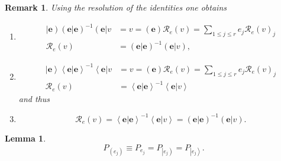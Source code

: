 \documentclass[aps,preprint]{revtex4}%
\newtheorem{lemma}[theorem]{Lemma}
\newtheorem{remark}[theorem]{Remark}
\begin{document}
\begin{remark}
Using the resolution of the identities one obtains

\begin{enumerate}
\item
\begin{align}
\left\vert \mathbf{e}\right)  \left(  \left.  \mathbf{e}\right\vert
\mathbf{e}\right)  ^{-1}\left(  \mathbf{e}\right\vert v  &  =v=\left(
\mathbf{e}\right)  \mathcal{R}_{e}\left(  v\right)  =\sum_{1\leq j\leq r}%
e_{j}\mathcal{R}_{e}\left(  v\right)  _{j}\\
\mathcal{R}_{e}\left(  v\right)   &  =\left(  \left.  \mathbf{e}\right\vert
\mathbf{e}\right)  ^{-1}\left(  \left.  \mathbf{e}\right\vert v\right)  ,
\end{align}


\item
\begin{align}
\left\vert \mathbf{e}\right\rangle \left\langle \left.  \mathbf{e}\right\vert
\mathbf{e}\right\rangle ^{-1}\left\langle \mathbf{e}\right\vert v  &
=v=\left(  \mathbf{e}\right)  \mathcal{R}_{e}\left(  v\right)  =\sum_{1\leq
j\leq r}e_{j}\mathcal{R}_{e}\left(  v\right)  _{j}\\
\mathcal{R}_{e}\left(  v\right)   &  =\left\langle \left.  \mathbf{e}%
\right\vert \mathbf{e}\right\rangle ^{-1}\left\langle \left.  \mathbf{e}%
\right\vert v\right\rangle
\end{align}
and thus

\item
\begin{equation}
\mathcal{R}_{e}\left(  v\right)  =\left\langle \left.  \mathbf{e}\right\vert
\mathbf{e}\right\rangle ^{-1}\left\langle \left.  \mathbf{e}\right\vert
v\right\rangle =\left(  \left.  \mathbf{e}\right\vert \mathbf{e}\right)
^{-1}\left(  \left.  \mathbf{e}\right\vert v\right)  .
\end{equation}

\end{enumerate}
\end{remark}

\begin{lemma}%
\begin{equation}
P_{\left(  e_{j}\right)  }\equiv P_{e_{j}}=P_{\left\vert e_{j}\right)
}=P_{\left\vert e_{j}\right\rangle }.
\end{equation}

\end{lemma}
\end{document}
